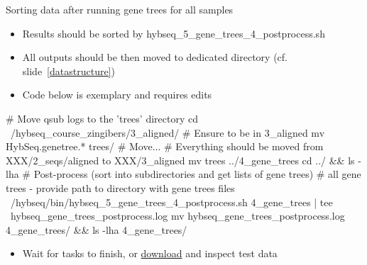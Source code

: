 \documentclass[compress,  xelatex, 11pt, xcolor=x11names, aspectratio=169,
	hyperref={
		bookmarks=true,
		unicode=true,
		colorlinks=true,
		pdftitle={HybSeq course},
		plainpages=false,
		pdfauthor={Vojtech Zeisek},
		pdfsubject={Practical processing of HybSeq target enrichment sequencing data on computing grids like MetaCentrum},
		pdfcreator={XeLaTeX},
		pdfkeywords={BASH, command line, GNU, HybSeq, Linux, MetaCentrum, sequencing shell, target enrichment},
		linkcolor=Turquoise4, %
		anchorcolor=DodgerBlue4, %
		citecolor=DodgerBlue4, %
		filecolor=DodgerBlue4, %
		menucolor=Tan4, %
		urlcolor=DarkOliveGreen4 %
		},
	url={hyphens, lowtilde} %
	]{beamer}
\renewcommand{\texttt}[1]{\colorbox{Cornsilk2}{{\ttfamily #1}}}
\renewcommand{\alert}[1]{\textcolor{OrangeRed3}{#1}}
\begin{document}
\begin{frame}[fragile]{Sorting data after running gene trees for all samples}
	\begin{itemize}
		\item Results should be sorted by \texttt{hybseq\_5\_gene\_trees\_4\_postprocess.sh}
		\item All outputs should be then moved to dedicated directory (cf. slide~\ref{datastructure})
		\item \alert{Code below is exemplary and requires edits}
	\end{itemize}
	\begin{bashcode}
    # Move qsub logs to the 'trees' directory
    cd ~/hybseq_course_zingibers/3_aligned/ # Ensure to be in 3_aligned
    mv HybSeq.genetree.* trees/ # Move...
    # Everything should be moved from XXX/2_seqs/aligned to XXX/3_aligned
    mv trees ../4_gene_trees
    cd ../ && ls -lha
    # Post-process (sort into subdirectories and get lists of gene trees)
    # all gene trees - provide path to directory with gene trees files
    ~/hybseq/bin/hybseq_5_gene_trees_4_postprocess.sh 4_gene_trees | tee \
      hybseq_gene_trees_postprocess.log
    mv hybseq_gene_trees_postprocess.log 4_gene_trees/ && ls -lha 4_gene_trees/
	\end{bashcode}
	\begin{itemize}
		\item Wait for tasks to finish, or \href{https://botany.natur.cuni.cz/zeisek/hybseq_course_zingibers_4_gene_trees.zip}{download} and inspect test data
	\end{itemize}
\end{frame}
\end{document}
